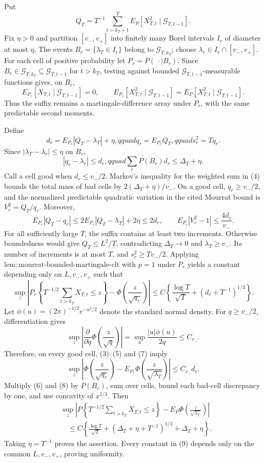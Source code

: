 Put
\[
 Q_T=T^{-1}\sum_{t=k_T+1}^T
 E_P[X_{T,t}^2\mid\mathcal G_{T,t-1}].
\tag{1}
\]
Fix \(\eta>0\) and partition \([v_-,v_+]\) into finitely many Borel intervals \(I_r\) of diameter at most \(\eta\). The events \(B_r=\{\lambda_T\in I_r\}\) belong to \(\mathcal G_{T,k_T}\); choose \(\lambda_r\in I_r\cap[v_-,v_+]\). For each cell of positive probability let \(P_r=P(\,\cdot\mid B_r)\). Since \(B_r\in\mathcal G_{T,k_T}\subseteq\mathcal G_{T,t-1}\) for \(t>k_T\), testing against bounded \(\mathcal G_{T,t-1}\)-measurable functions gives, on \(B_r\),
\[
 E_{P_r}[X_{T,t}\mid\mathcal G_{T,t-1}]=0,
 \qquad
 E_{P_r}[X_{T,t}^2\mid\mathcal G_{T,t-1}]
 =E_P[X_{T,t}^2\mid\mathcal G_{T,t-1}].
\tag{2}
\]
Thus the suffix remains a martingale-difference array under \(P_r\), with the same predictable second moments.

Define
\[
 d_r=E_{P_r}|Q_T-\lambda_T|+\eta,qquad
 q_r=E_{P_r}Q_T,qquad s_r^2=Tq_r.
\tag{3}
\]
Since \(|\lambda_T-\lambda_r|\le\eta\) on \(B_r\),
\[
 |q_r-\lambda_r|\le d_r,qquad
 \sum_rP(B_r)d_r\le\Delta_T+\eta.
\tag{4}
\]
Call a cell good when \(d_r\le v_-/2\). Markov's inequality for the weighted sum in (4) bounds the total mass of bad cells by \(2(\Delta_T+\eta)/v_-\). On a good cell, \(q_r\ge v_-/2\), and the normalized predictable quadratic variation in the cited Mourrat bound is \(V_r^2=Q_T/q_r\). Moreover,
\[
 E_{P_r}|Q_T-q_r|
 \le2E_{P_r}|Q_T-\lambda_T|+2\eta\le2d_r,
 \qquad E_{P_r}|V_r^2-1|\le\frac{4d_r}{v_-}.
\tag{5}
\]
For all sufficiently large \(T\), the suffix contains at least two increments. Otherwise boundedness would give \(Q_T\le L^2/T\), contradicting \(\Delta_T\to0\) and \(\lambda_T\ge v_-\). Its number of increments is at most \(T\), and \(s_r^2\ge Tv_-/2\). Applying \(\mathrm{lem:mourrat\text{-}bounded\text{-}martingale\text{-}clt}\) with \(p=1\) under \(P_r\) yields a constant depending only on \(L,v_-,v_+\) such that
\[
 \sup_z\left|P_r\!\left\{T^{-1/2}\sum_{t>k_T}X_{T,t}\le z\right\}
 -\Phi\!\left(\frac z{\sqrt{q_r}}\right)\right|
 \le C\left\{\frac{\log T}{\sqrt T}+(d_r+T^{-1})^{1/3}\right\}.
\tag{6}
\]
Let \(\phi(u)=(2\pi)^{-1/2}e^{-u^2/2}\) denote the standard normal density. For \(q\ge v_-/2\), differentiation gives
\[
 \sup_z\left|\frac{\partial}{\partial q}
 \Phi\!\left(\frac z{\sqrt q}\right)\right|
 =\sup_u\frac{|u|\phi(u)}{2q}\le C_{v_-}.
\tag{7}
\]
Therefore, on every good cell, (3)--(5) and (7) imply
\[
 \sup_z\left|\Phi\!\left(\frac z{\sqrt{q_r}}\right)
 -E_{P_r}\Phi\!\left(\frac z{\sqrt{\lambda_T}}\right)\right|
 \le C_{v_-}d_r.
\tag{8}
\]
Multiply (6) and (8) by \(P(B_r)\), sum over cells, bound each bad-cell discrepancy by one, and use concavity of \(x^{1/3}\). Then
\[
\begin{aligned}
 &\sup_z\left|P\!\left\{T^{-1/2}\sum_{t>k_T}X_{T,t}\le z\right\}
 -E_P\Phi\!\left(\frac z{\sqrt{\lambda_T}}\right)\right|\\
 &\quad\le C\left\{\frac{\log T}{\sqrt T}
 +(\Delta_T+\eta+T^{-1})^{1/3}+\Delta_T+\eta\right\}.
\end{aligned}
\tag{9}
\]
Taking \(\eta=T^{-1}\) proves the assertion. Every constant in (9) depends only on the common \(L,v_-,v_+\), proving uniformity.